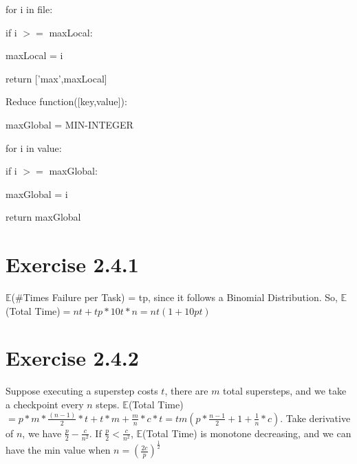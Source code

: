\documentclass{article}
\begin{document}
for i in file:

	if i $>=$ maxLocal:
		
		maxLocal = i
		
return ['max',maxLocal]

Reduce function([key,value]):

maxGlobal = MIN-INTEGER

for i in value:

	if i $>=$ maxGlobal:
		
		maxGlobal = i

return maxGlobal


\section{Exercise 2.4.1}

$\mathbb{E}$(\#Times Failure per Task) = tp, since it follows a Binomial Distribution. So, $\mathbb{E}$(Total Time)$ = nt+tp*10t*n = nt(1+10pt)$

\section{Exercise 2.4.2}

Suppose executing a superstep costs $t$, there are $m$ total supersteps, and we take a checkpoint every $n$ steps. $\mathbb{E}$(Total Time)$ = p*m*\frac{(n-1)}{2}*t + t*m + \frac{m}{n} * c * t = tm(p*\frac{n-1}{2}+1+\frac{1}{n}*c)$. Take derivative of $n$, we have $\frac{p}{2}-\frac{c}{n^2}$. If $\frac{p}{2}<\frac{c}{n^2}$, $\mathbb{E}$(Total Time) is monotone decreasing, and we can have the min value when $n=(\frac{2c}{p})^{\frac{1}{2}}$


\end{document}
